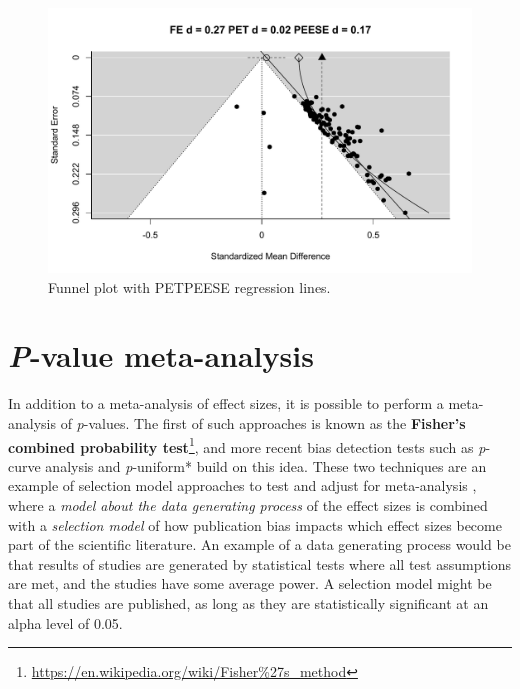 \documentclass[
  oneside]{krantz}
\renewcommand{\href}[2]{#2\footnote{\url{#1}}}
\begin{document}
\begin{figure}

{\centering \includegraphics[width=1\linewidth]{12-bias_files/figure-latex/petpeese-1} 

}

\caption{Funnel plot with PETPEESE regression lines.}\label{fig:petpeese}
\end{figure}

\hypertarget{p-value-meta-analysis}{%
\section{\texorpdfstring{\emph{P}-value meta-analysis}{P-value meta-analysis}}\label{p-value-meta-analysis}}

In addition to a meta-analysis of effect sizes, it is possible to perform a meta-analysis of \emph{p}-values. The first of such approaches is known as the \href{https://en.wikipedia.org/wiki/Fisher\%27s_method}{\textbf{Fisher's combined probability test}}, and more recent bias detection tests such as \emph{p}-curve analysis \citep{simonsohn_p-curve_2014} and \emph{p}-uniform* \citep{aert_correcting_2018} build on this idea. These two techniques are an example of selection model approaches to test and adjust for meta-analysis \citep{iyengar_selection_1988}, where a \emph{model about the data generating process} of the effect sizes is combined with a \emph{selection model} of how publication bias impacts which effect sizes become part of the scientific literature. An example of a data generating process would be that results of studies are generated by statistical tests where all test assumptions are met, and the studies have some average power. A selection model might be that all studies are published, as long as they are statistically significant at an alpha level of 0.05.
\end{document}
